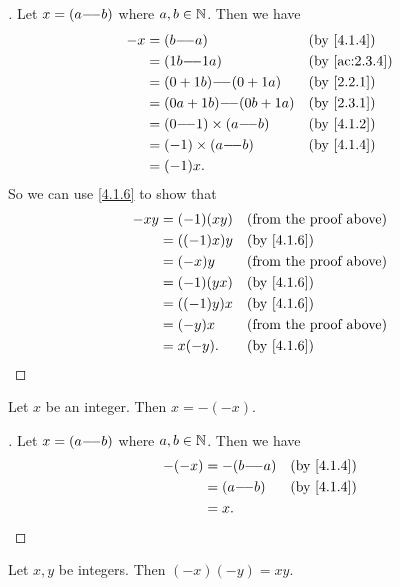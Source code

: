 \begin{proof}[]
  Let \(x = (a {-}\!{-} b)\) where \(a, b \in \mathbb{N}\).
  Then we have
  \begin{align*}
    -x & = (b \mm a)                  &  & \by{4.1.4}    \\
       & = (1b \mm 1a)                &  & \by{ac:2.3.4} \\
       & = (0 + 1b) \mm (0 + 1a)      &  & \by{2.2.1}    \\
       & = (0a + 1b) \mm (0b + 1a)    &  & \by{2.3.1}    \\
       & = (0 \mm 1) \times (a \mm b) &  & \by{4.1.2}    \\
       & = (-1) \times (a \mm b)      &  & \by{4.1.4}    \\
       & = (-1) x.
  \end{align*}
  So we can use \cref{4.1.6} to show that
  \begin{align*}
    -xy & = (-1) (xy)  &  & \text{(from the proof above)} \\
        & = ((-1) x) y &  & \by{4.1.6}                    \\
        & = (-x) y     &  & \text{(from the proof above)} \\
        & = (-1) (yx)  &  & \by{4.1.6}                    \\
        & = ((-1) y) x &  & \by{4.1.6}                    \\
        & = (-y) x     &  & \text{(from the proof above)} \\
        & = x (-y).    &  & \by{4.1.6}
  \end{align*}
\end{proof}

\begin{ac}\label{ac:4.1.6}
  Let \(x\) be an integer.
  Then \(x = -(-x)\).
\end{ac}

\begin{proof}[]
  Let \(x = (a {-}\!{-} b)\) where \(a, b \in \mathbb{N}\).
  Then we have
  \begin{align*}
    -(-x) & = -(b \mm a) &  & \by{4.1.4} \\
          & = (a \mm b)  &  & \by{4.1.4} \\
          & = x.
  \end{align*}
\end{proof}

\begin{ac}\label{ac:4.1.7}
  Let \(x, y\) be integers.
  Then \((-x)(-y) = xy\).
\end{ac}


